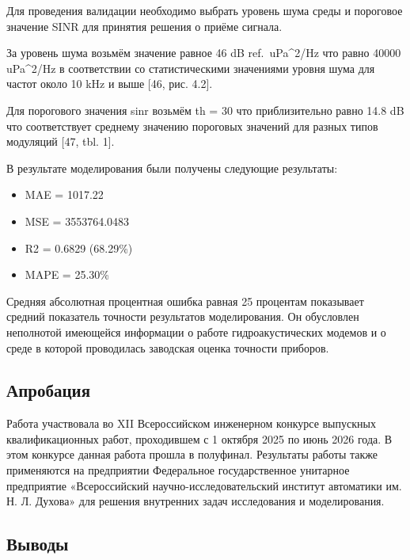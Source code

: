 \documentclass[
    numbers=section,
    document-code={ВКРБ--09.03.04--10.19--XX--26--81}
]{../latex/fqw}
\providecommand{\hl}[1]{#1}
\begin{document}
    Для проведения валидации необходимо выбрать уровень шума среды и
    пороговое значение SINR для принятия решения о приёме сигнала.

    \hl{За уровень шума возьмём значение равное 46 dB ref.\ uPa\^{}2/Hz что
    равно 40000 uPa\^{}2/Hz в соответствии со статистическими значениями
    уровня шума для частот около 10 kHz и выше {[}46, рис. 4.2{]}.}

    \hl{Для порогового значения sinr возьмём th = 30 что приблизительно равно 14.8 dB что
    соответствует среднему значению пороговых значений для разных типов модуляций {[}47, tbl. 1{]}.}

    В результате моделирования были получены следующие результаты:

    \begin{itemize}
        \item MAE = 1017.22
        \item MSE = 3553764.0483
        \item R2 = 0.6829 (68.29\%)
        \item MAPE = 25.30\%
    \end{itemize}

    Средняя абсолютная процентная ошибка равная 25 процентам показывает
    средний показатель точности результатов моделирования. Он обусловлен
    неполнотой имеющейся информации о работе гидроакустических модемов и
    о среде в которой проводилась заводская оценка точности приборов.

    \subsection{Апробация}\label{subsec:validation}

    Работа участвовала во XII Всероссийском инженерном конкурсе выпускных квалификационных работ,
    проходившем с 1 октября 2025 по июнь 2026 года.
    В этом конкурсе данная работа прошла в полуфинал.
    Результаты работы также применяются на предприятии Федеральное государственное унитарное предприятие
    «Всероссийский научно-исследовательский институт автоматики им. Н. Л. Духова»
    для решения внутренних задач исследования и моделирования.

    \subsection*{Выводы}\label{subsec:conclusions_of_chapter_4}
\end{document}
